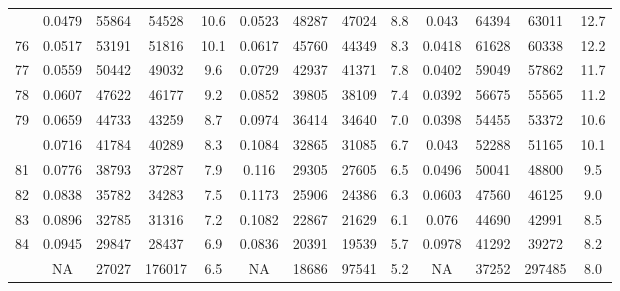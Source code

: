 \documentclass[
  14pt,
]{article}
\begin{document}
\begin{longtable}[t]{lcccccccccccc}
\addlinespace
75 & 0.0479 & 55864 & 54528 & 10.6 & 0.0523 & 48287 & 47024 & 8.8 & 0.043 & 64394 & 63011 & 12.7\\
76 & 0.0517 & 53191 & 51816 & 10.1 & 0.0617 & 45760 & 44349 & 8.3 & 0.0418 & 61628 & 60338 & 12.2\\
77 & 0.0559 & 50442 & 49032 & 9.6 & 0.0729 & 42937 & 41371 & 7.8 & 0.0402 & 59049 & 57862 & 11.7\\
78 & 0.0607 & 47622 & 46177 & 9.2 & 0.0852 & 39805 & 38109 & 7.4 & 0.0392 & 56675 & 55565 & 11.2\\
79 & 0.0659 & 44733 & 43259 & 8.7 & 0.0974 & 36414 & 34640 & 7.0 & 0.0398 & 54455 & 53372 & 10.6\\
\addlinespace
80 & 0.0716 & 41784 & 40289 & 8.3 & 0.1084 & 32865 & 31085 & 6.7 & 0.043 & 52288 & 51165 & 10.1\\
81 & 0.0776 & 38793 & 37287 & 7.9 & 0.116 & 29305 & 27605 & 6.5 & 0.0496 & 50041 & 48800 & 9.5\\
82 & 0.0838 & 35782 & 34283 & 7.5 & 0.1173 & 25906 & 24386 & 6.3 & 0.0603 & 47560 & 46125 & 9.0\\
83 & 0.0896 & 32785 & 31316 & 7.2 & 0.1082 & 22867 & 21629 & 6.1 & 0.076 & 44690 & 42991 & 8.5\\
84 & 0.0945 & 29847 & 28437 & 6.9 & 0.0836 & 20391 & 19539 & 5.7 & 0.0978 & 41292 & 39272 & 8.2\\
\addlinespace
85 & NA & 27027 & 176017 & 6.5 & NA & 18686 & 97541 & 5.2 & NA & 37252 & 297485 & 8.0\\*
\end{longtable}
\end{document}
